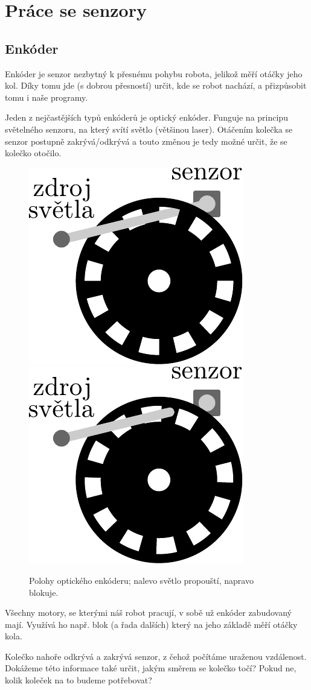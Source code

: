 \documentclass[../main.tex]{subfiles}
\begin{document}
	\section{Práce se senzory}
	
	\subsection{Enkóder}\label{cha:encoder}
	Enkóder je senzor nezbytný k přesnému pohybu robota, jelikož měří otáčky jeho kol. Díky tomu jde (s dobrou přesností) určit, kde se robot nachází, a přizpůsobit tomu i naše programy.

	Jeden z nejčastějších typů enkóderů je optický enkóder. Funguje na principu světelného senzoru, na který svítí světlo (většinou laser). Otáčením kolečka se senzor postupně zakrývá/odkrývá a touto změnou je tedy možné určit, že se kolečko otočilo.

	\begin{figure}
		\centering%
		\includegraphics[width=0.25\linewidth]{Images/03/encoder-through.pdf}
		\hspace{.15\textwidth}%
		\includegraphics[width=0.25\linewidth]{Images/03/encoder-blocked.pdf}
		\caption{Polohy optického enkóderu; nalevo světlo propouští, napravo blokuje.}
	\end{figure}

	Všechny motory, se kterými náš robot pracují, v sobě už enkóder zabudovaný mají. Využívá ho např. blok \blockMotorDistanceImage (a řada dalších) který na jeho základě měří otáčky kola.

	\begin{question}
		Kolečko nahoře odkrývá a zakrývá senzor, z čehož počítáme uraženou vzdálenost. Dokážeme této informace také určit, jakým směrem se kolečko točí? Pokud ne, kolik koleček na to budeme potřebovat?
	\end{question}
\end{document}
